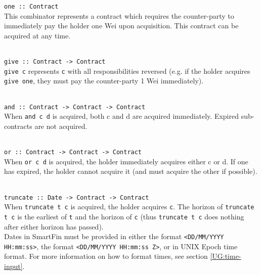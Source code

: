 \parbox{\textwidth}{
\texttt{one :: Contract} \\

This combinator represents a contract which requires the counter-party to immediately pay the holder one Wei upon acquisition. This contract can be acquired at any time. \\ \\
}

\parbox{\textwidth}{
\texttt{give :: Contract -> Contract} \\

\texttt{give c} represents \texttt{c} with all responsibilities reversed (e.g. if the holder acquires \texttt{give one}, they must pay the counter-party 1 Wei immediately). \\ \\

}

\parbox{\textwidth}{
\texttt{and :: Contract -> Contract -> Contract} \\

When \texttt{and c d} is acquired, both c and d are acquired immediately. Expired sub-contracts are not acquired. \\ \\
}

\parbox{\textwidth}{
\texttt{or :: Contract -> Contract -> Contract} \\

When \texttt{or c d} is acquired, the holder immediately acquires either c or d. If one has expired, the holder cannot acquire it (and must acquire the other if possible). \\ \\
}

\parbox{\textwidth}{
\texttt{truncate :: Date -> Contract -> Contract} \\

When \texttt{truncate t c} is acquired, the holder acquires \texttt{c}. The horizon of \texttt{truncate t c} is the earliest of \texttt{t} and the horizon of \texttt{c} (thus \texttt{truncate t c} does nothing after either horizon has passed). \\

Dates in SmartFin must be provided in either the format \texttt{<DD/MM/YYYY HH:mm:ss>}, the format \texttt{<DD/MM/YYYY HH:mm:ss Z>}, or in UNIX Epoch time format. For more information on how to format times, see section \ref{UG:time-input}. \\ \\
}

